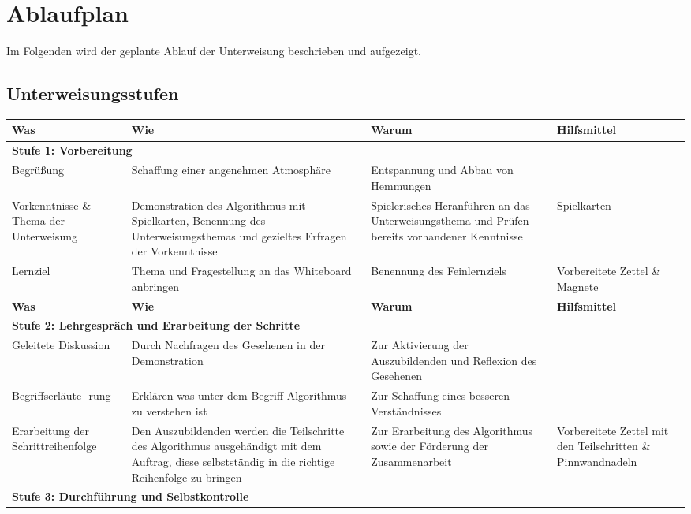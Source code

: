 \section{Ablaufplan}

Im Folgenden wird der geplante Ablauf der Unterweisung beschrieben und aufgezeigt.

\pagebreak
\subsection{Unterweisungsstufen}
\begin{longtable}{ |p{3cm}|p{3cm}|p{3cm}|p{3cm}|}
\hline
\textbf{Was} & \textbf{Wie} & \textbf{Warum} & \textbf{Hilfsmittel} \\
\hline
\multicolumn{4}{|l|}{\textbf{Stufe 1: Vorbereitung}}  \\
 \hline
Begrüßung  & Schaffung einer angenehmen Atmosphäre  & Entspannung und Abbau von Hemmungen & \\
 \hline
 Vorkenntnisse \& Thema der Unterweisung & Demonstration des Algorithmus mit Spielkarten, Benennung des Unterweisungsthemas und gezieltes Erfragen der Vorkenntnisse & Spielerisches Heranführen an das Unterweisungsthema und Prüfen bereits vorhandener Kenntnisse & Spielkarten\\
 \hline
Lernziel  & Thema und Fragestellung an das Whiteboard anbringen & Benennung des Feinlernziels & Vorbereitete Zettel \& Magnete  \\
 \hline
  \pagebreak
   \hline
  \textbf{Was} & \textbf{Wie} & \textbf{Warum} & \textbf{Hilfsmittel} \\
 \hline
\multicolumn{4}{|l|}{\textbf{Stufe 2: Lehrgespräch und Erarbeitung der Schritte}}  \\
\hline
 Geleitete Diskussion & Durch Nachfragen des Gesehenen in der Demonstration & Zur Aktivierung der Auszubildenden und Reflexion des Gesehenen & \\
 \hline
 Begriffserläute- rung & Erklären was unter dem Begriff Algorithmus zu verstehen ist & Zur Schaffung eines besseren Verständnisses & \\
 \hline
Erarbeitung der Schrittreihenfolge  & Den Auszubildenden werden die Teilschritte des Algorithmus ausgehändigt mit dem Auftrag, diese selbstständig in die richtige Reihenfolge zu bringen & Zur Erarbeitung des Algorithmus sowie der Förderung der Zusammenarbeit  & Vorbereitete Zettel mit den Teilschritten \& Pinnwandnadeln\\
 \hline
\multicolumn{4}{|l|}{\textbf{Stufe 3: Durchführung und Selbstkontrolle}}  \\

\end{longtable}
